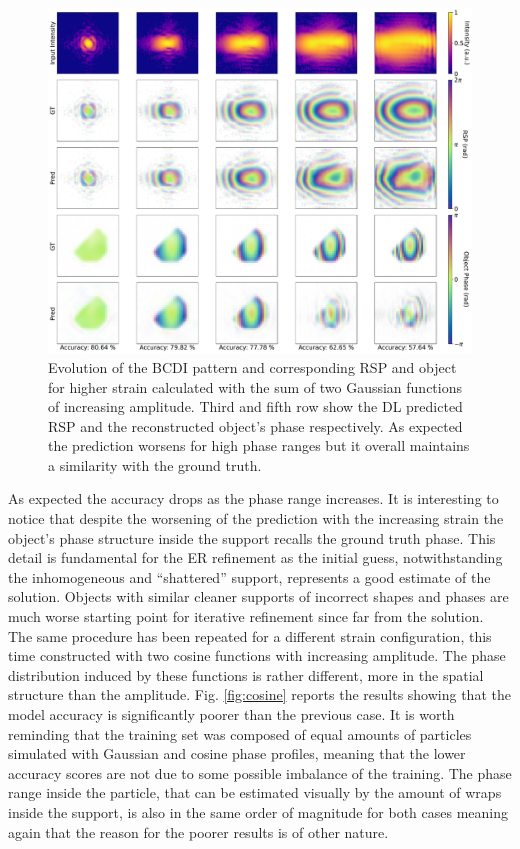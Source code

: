 \begin{figure}[H]
    \centering
    \includegraphics[width=\textwidth]{figures/Phasing/performance_gauss.pdf}
    \caption{Evolution of the BCDI pattern and corresponding RSP and object for higher strain calculated with the sum of 
    two Gaussian functions of increasing amplitude. Third and fifth row show the DL predicted RSP and the reconstructed 
    object's phase respectively. As expected the prediction worsens for high phase ranges but it overall maintains a similarity 
    with the ground truth.}
    \label{fig:gauss}
\end{figure}

As expected the accuracy drops as the phase range increases.
It is interesting to notice that despite the worsening of the prediction with the increasing strain the object's phase 
structure inside the support recalls the ground truth phase. This detail is fundamental for the ER refinement as the 
initial guess, notwithstanding the inhomogeneous and ``shattered'' support, represents a good estimate of the solution. 
Objects with similar cleaner supports of incorrect shapes and phases are much worse starting point for iterative refinement 
since far from the solution. \\

The same procedure has been repeated for a different strain configuration, this time constructed with two cosine functions 
with increasing amplitude. The phase distribution induced by these functions is rather different, more in the spatial 
structure than the amplitude. Fig. \ref{fig:cosine} reports the results showing that the model accuracy is significantly 
poorer than the previous case. It is worth reminding that the training set was composed of equal amounts of particles 
simulated with Gaussian and cosine phase profiles, meaning that the lower accuracy scores are not due to some possible 
imbalance of the training. The phase range inside the particle, that can be estimated visually by the amount of wraps inside 
the support, is also in the same order of magnitude for both cases meaning again that the reason for the poorer results 
is of other nature. 
 
